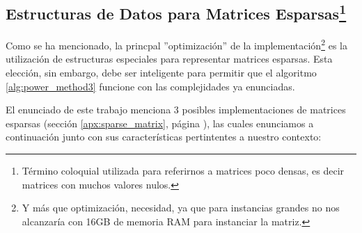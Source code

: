 \subsection{Estructuras de Datos para Matrices
Esparsas\protect\footnote{T\'ermino coloquial utilizada para referirnos a
matrices poco densas, es decir matrices con muchos valores nulos.}}
\par Como se ha mencionado, la princpal ''optimizaci\'on'' de la
implementaci\'on\footnote{Y m\'as que optimizaci\'on, necesidad, ya que para
instancias grandes no nos alcanzar\'ia con 16GB de memoria RAM para
instanciar la matriz.} es la utilizaci\'on de estructuras especiales para
representar matrices esparsas. Esta elecci\'on, sin embargo, debe ser
inteligente para permitir que el algoritmo \ref{alg:power_method3} funcione con
las complejidades ya enunciadas.

\par El enunciado de este trabajo menciona 3 posibles implementaciones de
matrices esparsas (secci\'on \ref{apx:sparse_matrix}, p\'agina
\pageref{apx:sparse_matrix}), las cuales enunciamos a continuaci\'on junto con
sus caracter\'isticas pertintentes a nuestro contexto:

